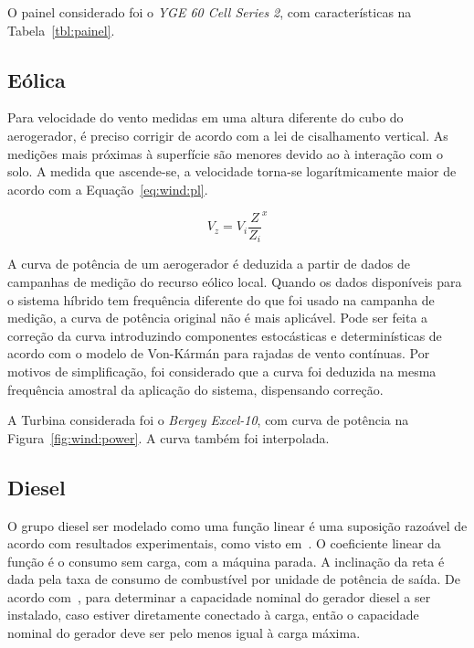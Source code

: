 O painel considerado foi o \emph{YGE 60 Cell Series 2}, com características na
Tabela~\ref{tbl:painel}.



\subsection{Eólica}

Para velocidade do vento medidas em uma altura diferente do cubo do aerogerador,
é preciso corrigir de acordo com a lei de cisalhamento vertical. As medições
mais próximas à superfície são menores devido ao à interação com o solo. A
medida que ascende-se, a velocidade torna-se logarítmicamente maior de acordo
com a Equação~\ref{eq:wind:pl}.

\begin{equation}
  \label{eq:wind:pl}  V_z = V_i \frac{Z}{Z_i}^x
\end{equation}

A curva de potência de um aerogerador é deduzida a partir de dados de campanhas
de medição do recurso eólico local.  Quando os dados disponíveis para o sistema
híbrido tem frequência diferente do que foi usado na campanha de medição, a
curva de potência original não é mais aplicável. Pode ser feita a correção da
curva introduzindo componentes estocásticas e determinísticas de acordo com o
modelo de Von-Kármán para rajadas de vento contínuas. Por motivos de
simplificação, foi considerado que a curva foi deduzida na mesma frequência
amostral da aplicação do sistema, dispensando correção.

A Turbina considerada foi o \emph{Bergey Excel-10}, com curva de potência na
Figura~\ref{fig:wind:power}. A curva também foi interpolada.



\subsection{Diesel}

O grupo diesel ser modelado como uma função linear é uma suposição razoável de
acordo com resultados experimentais, como visto
em~\cite[cap.~6.1]{manwell2006hybrid2}. O coeficiente linear da função é o
consumo sem carga, com a máquina parada. A inclinação da reta é dada pela taxa
de consumo de combustível por unidade de potência de saída.  De acordo
com~\cite{Nema_2009}, para determinar a capacidade nominal do gerador diesel a
ser instalado, caso estiver diretamente conectado à carga, então o capacidade
nominal do gerador deve ser pelo menos igual à carga máxima.

